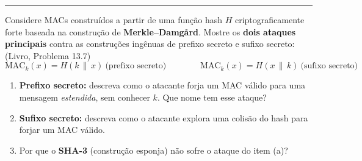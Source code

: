 \documentclass[11pt,a4paper]{article}
\newcommand{\livro}[1]{{\footnotesize\color{black!50}(Livro, Problema #1)}}
\newcommand{\exercicio}[1]{%
    \Needspace{8\baselineskip}%
    \par\vspace{1.2em}
    \noindent
    {\color{black!55}\rule[-0.25em]{3pt}{1.6em}}%
    \hspace{0.6em}{\Large\bfseries Exerc\'{i}cio #1}
    \par\vspace{-0.4em}
    \noindent{\color{black!35}\rule{\textwidth}{0.4pt}}
    \par\vspace{0.35em}
}
\begin{document}
\exercicio{3}
Considere MACs constru\'{i}dos a partir de uma fun\c{c}\~{a}o hash $H$ criptograficamente forte baseada na constru\c{c}\~{a}o de \textbf{Merkle--Damg\r{a}rd}. Mostre os \textbf{dois ataques principais} contra as constru\c{c}\~{o}es ing\^{e}nuas de prefixo secreto e sufixo secreto: \livro{13.7}
\[
    \text{MAC}_k(x) = H(k \,\|\, x) \ \text{(prefixo secreto)}
    \qquad\qquad
    \text{MAC}_k(x) = H(x \,\|\, k) \ \text{(sufixo secreto)}
\]
\begin{enumerate}[label=(\alph*)]
    \item \textbf{Prefixo secreto:} descreva como o atacante forja um MAC v\'{a}lido para uma mensagem \emph{estendida}, sem conhecer $k$. Que nome tem esse ataque?
    \item \textbf{Sufixo secreto:} descreva como o atacante explora uma colis\~{a}o do hash para forjar um MAC v\'{a}lido.
    \item Por que o \textbf{SHA-3} (constru\c{c}\~{a}o esponja) n\~{a}o sofre o ataque do item (a)?
\end{enumerate}
\end{document}
